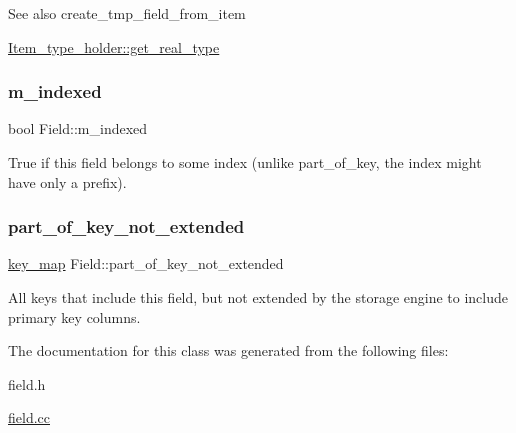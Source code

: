 \begin{DoxySeeAlso}{See also}
create\+\_\+tmp\+\_\+field\+\_\+from\+\_\+item 

\mbox{\hyperlink{classItem__type__holder_a69dd50259fdc25d5e6cd9c61f2d9fd20}{Item\+\_\+type\+\_\+holder\+::get\+\_\+real\+\_\+type}} 
\end{DoxySeeAlso}
\mbox{\label{classField_a835e8163e25bed88602103c982fba53e}} 
\subsubsection{\texorpdfstring{m\+\_\+indexed}{m\_indexed}}
{\footnotesize\ttfamily bool Field\+::m\+\_\+indexed}

True if this field belongs to some index (unlike part\+\_\+of\+\_\+key, the index might have only a prefix). \mbox{\label{classField_acad55d6d1c2298e6450bb7ea0a6fa3ee}} 
\subsubsection{\texorpdfstring{part\+\_\+of\+\_\+key\+\_\+not\+\_\+extended}{part\_of\_key\_not\_extended}}
{\footnotesize\ttfamily \mbox{\hyperlink{classBitmap_3_0164_01_4}{key\+\_\+map}} Field\+::part\+\_\+of\+\_\+key\+\_\+not\+\_\+extended}

All keys that include this field, but not extended by the storage engine to include primary key columns. 

The documentation for this class was generated from the following files\+:\begin{DoxyCompactItemize}
\item 
field.\+h\item 
\mbox{\hyperlink{field_8cc}{field.\+cc}}\end{DoxyCompactItemize}
